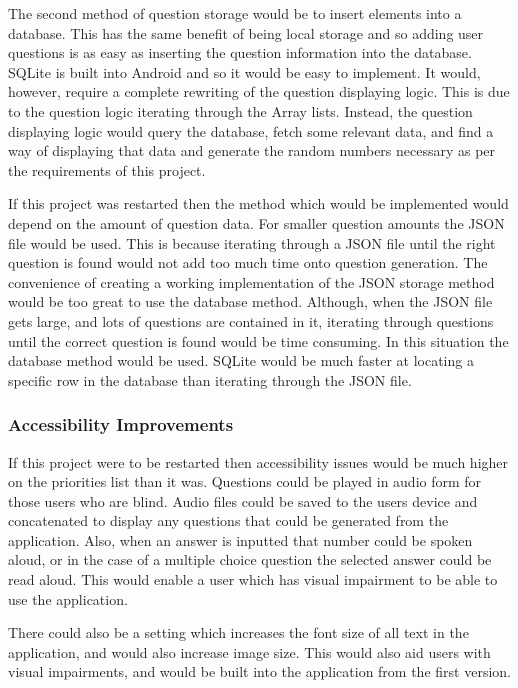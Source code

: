 \documentclass{article}
\begin{document}
The second method of question storage would be to insert elements into a database. This has the same benefit of being local storage and so adding user questions is as easy as inserting the question information into the database. SQLite is built into Android and so it would be easy to implement. It would, however, require a complete rewriting of the question displaying logic. This is due to the question logic iterating through the Array lists. Instead, the question displaying logic would query the database, fetch some relevant data, and find a way of displaying that data and generate the random numbers necessary as per the requirements of this project. \par

If this project was restarted then the method which would be implemented would depend on the amount of question data. For smaller question amounts the JSON file would be used. This is because iterating through a JSON file until the right question is found would not add too much time onto question generation. The convenience of creating a working implementation of the JSON storage method would be too great to use the database method. Although, when the JSON file gets large, and lots of questions are contained in it, iterating through questions until the correct question is found would be time consuming. In this situation the database method would be used. SQLite would be much faster at locating a specific row in the database than iterating through the JSON file. \par

\subsubsection{Accessibility Improvements}

If this project were to be restarted then accessibility issues would be much higher on the priorities list than it was. Questions could be played in audio form for those users who are blind. Audio files could be saved to the users device and concatenated to display any questions that could be generated from the application. Also, when an answer is inputted that number could be spoken aloud, or in the case of a multiple choice question the selected answer could be read aloud. This would enable a user which has visual impairment to be able to use the application. \par

There could also be a setting which increases the font size of all text in the application, and would also increase image size. This would also aid users with visual impairments, and would be built into the application from the first version. \par
\end{document}
